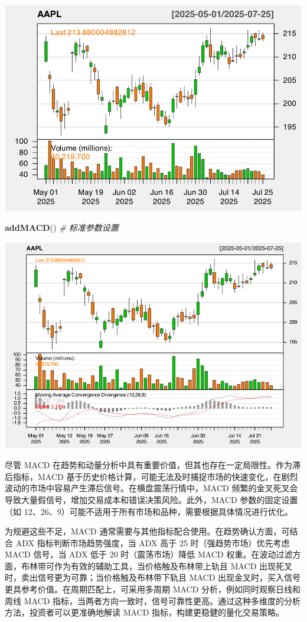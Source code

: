 \documentclass[]{ctexbook}
\newenvironment{Shaded}{\begin{snugshade}}{\end{snugshade}}
\newcommand{\CommentTok}[1]{\textcolor[rgb]{0.56,0.35,0.01}{\textit{#1}}}
\newcommand{\FunctionTok}[1]{\textcolor[rgb]{0.13,0.29,0.53}{\textbf{#1}}}
\newcommand{\NormalTok}[1]{#1}
\begin{document}
\includegraphics[width=0.9\linewidth]{QuantmodHandbook_files/figure-latex/macd-1}

\begin{Shaded}
\begin{Highlighting}[]
\FunctionTok{addMACD}\NormalTok{()  }\CommentTok{\# 标准参数设置}
\end{Highlighting}
\end{Shaded}

\includegraphics[width=0.9\linewidth]{QuantmodHandbook_files/figure-latex/macd-2}

尽管 MACD 在趋势和动量分析中具有重要价值，但其也存在一定局限性。作为滞后指标，MACD 基于历史价格计算，可能无法及时捕捉市场的快速变化，在剧烈波动的市场中容易产生滞后信号。在横盘震荡行情中，MACD 频繁的金叉死叉会导致大量假信号，增加交易成本和错误决策风险。此外，MACD 参数的固定设置（如 12、26、9）可能不适用于所有市场和品种，需要根据具体情况进行优化。

为规避这些不足，MACD 通常需要与其他指标配合使用。在趋势确认方面，可结合 ADX 指标判断市场趋势强度，当 ADX 高于 25 时（强趋势市场）优先考虑 MACD 信号，当 ADX 低于 20 时（震荡市场）降低 MACD 权重。在波动过滤方面，布林带可作为有效的辅助工具，当价格触及布林带上轨且 MACD 出现死叉时，卖出信号更为可靠；当价格触及布林带下轨且 MACD 出现金叉时，买入信号更具参考价值。在周期匹配上，可采用多周期 MACD 分析，例如同时观察日线和周线 MACD 指标，当两者方向一致时，信号可靠性更高。通过这种多维度的分析方法，投资者可以更准确地解读 MACD 指标，构建更稳健的量化交易策略。
\end{document}
